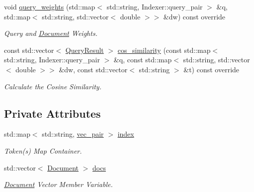 \begin{DoxyCompactItemize}
void \hyperlink{class_document_indexer_ad9a1b17fec1c999e98b58e3433727f05}{query\+\_\+weights} (std\+::map$<$ std\+::string, Indexer\+::query\+\_\+pair $>$ \&q, std\+::map$<$ std\+::string, std\+::vector$<$ double $>$$>$ \&dw) const override
\begin{DoxyCompactList}\small\item\em Query and \hyperlink{class_document}{Document} Weights. \end{DoxyCompactList}\item 
const std\+::vector$<$ \hyperlink{class_query_result}{Query\+Result} $>$ \hyperlink{class_document_indexer_a8738997048b5bfd336f48bade7715cc6}{cos\+\_\+similarity} (const std\+::map$<$ std\+::string, Indexer\+::query\+\_\+pair $>$ \&q, const std\+::map$<$ std\+::string, std\+::vector$<$ double $>$$>$ \&dw, const std\+::vector$<$ std\+::string $>$ \&t) const override
\begin{DoxyCompactList}\small\item\em Calculate the Cosine Similarity. \end{DoxyCompactList}\end{DoxyCompactItemize}
\subsection*{Private Attributes}
\begin{DoxyCompactItemize}
\item 
std\+::map$<$ std\+::string, \hyperlink{class_document_indexer_a8a84f5e40d9364c31e81627270142628}{vec\+\_\+pair} $>$ \hyperlink{class_document_indexer_a1a03f236f4ed59ee96f47e0c0f1d53be}{index}
\begin{DoxyCompactList}\small\item\em Token(s) Map Container. \end{DoxyCompactList}\item 
std\+::vector$<$ \hyperlink{class_document}{Document} $>$ \hyperlink{class_document_indexer_ae16293674b0d10d0a859232e65dba989}{docs}
\begin{DoxyCompactList}\small\item\em \hyperlink{class_document}{Document} Vector Member Variable. \end{DoxyCompactList}\end{DoxyCompactItemize}
